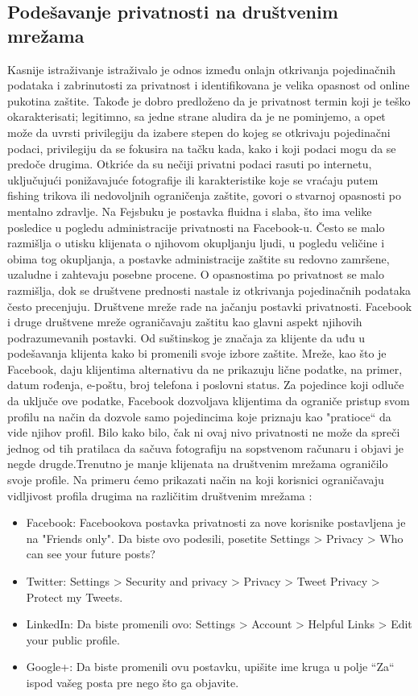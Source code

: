 \documentclass[a4paper]{article}
\begin{document}
\subsection{Podešavanje privatnosti na društvenim  mrežama}
 Kasnije istraživanje istraživalo je odnos između onlajn otkrivanja pojedinačnih podataka i zabrinutosti za privatnost i identifikovana je velika opasnost od online pukotina zaštite.  Takođe je dobro predloženo  da je privatnost termin koji je teško okarakterisati; legitimno, sa jedne strane aludira  da je ne pominjemo, a opet može da uvrsti privilegiju da izabere stepen do kojeg se otkrivaju pojedinačni podaci, privilegiju da se fokusira na tačku kada, kako i koji  podaci mogu da se predoče  drugima. Otkriće da su nečiji privatni podaci rasuti  po internetu, uključujući  ponižavajuće fotografije ili karakteristike  koje se vraćaju putem fishing  trikova ili nedovoljnih ograničenja zaštite, govori o stvarnoj opasnosti po mentalno zdravlje. 
 Na  Fejsbuku je  postavka  fluidna i slaba, što ima velike posledice u pogledu administracije privatnosti na Facebook-u.  Često se malo  razmišlja o utisku  klijenata o njihovom okupljanju ljudi, u pogledu  veličine i obima  tog okupljanja, a  postavke administracije zaštite su redovno zamršene, uzaludne i zahtevaju posebne procene. O opasnostima po privatnost se malo razmišlja, dok se društvene prednosti nastale iz otkrivanja pojedinačnih podataka često precenjuju. Društvene mreže rade na jačanju postavki privatnosti. Facebook i druge društvene mreže ograničavaju zaštitu kao glavni aspekt njihovih podrazumevanih postavki. Od suštinskog je značaja za klijente da uđu u podešavanja klijenta kako bi promenili svoje izbore zaštite.  Mreže, kao  što je Facebook, daju   klijentima alternativu da ne   prikazuju  lične podatke, na primer, datum rođenja, e-poštu, broj telefona i poslovni status. Za pojedince koji odluče da uključe ove podatke, Facebook dozvoljava klijentima da ograniče pristup svom profilu na način da dozvole samo pojedincima koje priznaju  kao "pratioce“ da vide njihov profil.  Bilo kako bilo, čak ni ovaj nivo privatnosti ne može da spreči jednog od tih pratilaca da sačuva fotografiju na sopstvenom računaru i objavi je negde drugde.Trenutno je manje klijenata na društvenim mrežama  ograničilo svoje profile.
Na primeru ćemo prikazati način na koji korisnici ograničavaju  vidljivost profila drugima na različitim društvenim mrežama :
\begin{itemize}
\item Facebook: Facebookova postavka privatnosti za nove korisnike postavljena je na "Friends only". Da biste ovo podesili, posetite Settings > Privacy > Who can see your future posts?
\item Twitter: Settings > Security and privacy > Privacy > Tweet Privacy > Protect my Tweets.
\item LinkedIn: Da biste promenili ovo: Settings >  Account > Helpful Links > Edit your public profile.
\item Google+: Da biste promenili ovu postavku, upišite ime kruga u polje “Za“ ispod vašeg posta pre nego što ga objavite.
\end{itemize}
\end{document}
